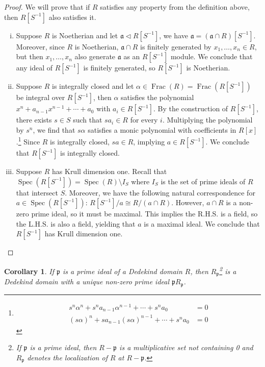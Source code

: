\documentclass{tufte-handout} %
\newtheorem{cor}[thm]{Corollary}
\theoremstyle{definition}
\theoremstyle{remark}
\newcommand{\lp}{{\mathfrak{p}}}
\DeclareMathOperator{\ff}{Frac}
\DeclareMathOperator{\spec}{Spec}
\begin{document}
\begin{proof}
	We will prove that if $R$ satisfies any property from the definition above, then $R[S^{-1}]$ also satisfies it.
	\begin{enumerate}[(i)]
		\item Suppose $R$ is Noetherian and let $\mathfrak{a} \lhd R[S^{-1}]$, we have $\mathfrak{a} = (\mathfrak{a} \cap R)[S^{-1}]$. Moreover, since $R$ is Noetherian, $\mathfrak{a} \cap R$ is finitely generated by $x_1, \dots, x_n \in R$, but then $x_1, \dots, x_n$ also generate $\mathfrak{a}$ as an $R[S^{-1}]$ module. We conclude that any ideal of $R[S^{-1}]$ is finitely generated, so $R[S^{-1}]$ is Noetherian.
		\item Suppose $R$ is integrally closed and let $\alpha \in \ff(R) = \ff(R[S^{-1}])$ be integral over $R[S^{-1}]$, then $\alpha$ satisfies the polynomial $x^n+ a_{n-1}x^{n-1}+ \cdots + a_0$ with $a_i \in R[S^{-1}]$. By the construction of $R[S^{-1}]$, there exists $s \in S$ such that $sa_i \in R$ for every $i$. Multiplying the polynomial by $s^n$, we find that $s\alpha$ satisfies a monic polynomial with coefficients in $R[x]$.\footnote{\begin{align*}s^n\alpha^n + s^na_{n-1}\alpha^{n-1} + \cdots + s^na_0 &= 0\\(s\alpha)^n + sa_{n-1}(s\alpha)^{n-1} + \cdots + s^na_0&=0\end{align*}} Since $R$ is integrally closed, $sa \in R$, implying $a \in R[S^{-1}]$. We conclude that $R[S^{-1}]$ is integrally closed.
		\item Suppose $R$ has Krull dimension one. Recall that $\spec(R[S^{-1}]) = \spec(R) \setminus I_S$ where $I_S$ is the set of prime ideals of $R$ that intersect $S$. Moreover, we have the following natural correspondence for $a \in \spec(R[S^{-1}])$: $R[S^{-1}]/a \cong R/(a \cap R)$. However, $a \cap R$ is a non-zero prime ideal, so it must be maximal. This implies the R.H.S. is a field, so the L.H.S. is also a field, yielding that $a$ is a maximal ideal. We conclude that $R[S^{-1}]$ has Krull dimension one. %
	\end{enumerate}
\end{proof}
\begin{cor}
	If $\lp$ is a prime ideal of a Dedekind domain $R$, then $R_{\lp}$\footnote{If $\lp$ is a prime ideal, then $R-\lp$ is a multiplicative set not containing 0 and $R_{\lp}$ denotes the localization of $R$ at $R-\lp$.} is a Dedekind domain with a unique non-zero prime ideal $\lp R_{\lp}$.
\end{cor}
\end{document}
